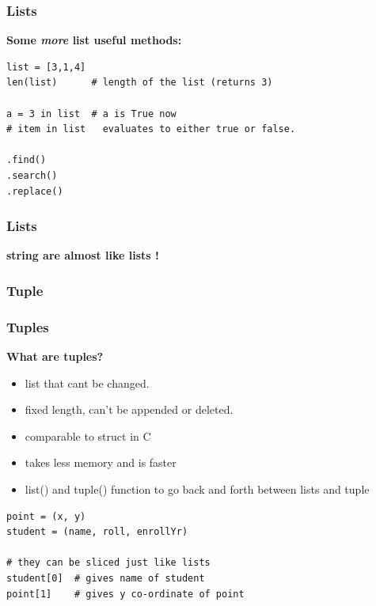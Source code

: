 \documentclass[12pt, aspectratio=169]{beamer}
\begin{document}
\begin{frame}[fragile]
  \frametitle{Lists}
\textbf{Some \textit{more} list useful methods: }
\vspace{1em}
\begin{verbatim}
list = [3,1,4] 
len(list)      # length of the list (returns 3)

a = 3 in list  # a is True now
# item in list   evaluates to either true or false.

.find()
.search()
.replace()

\end{verbatim}
\end{frame}

\begin{frame}[fragile]
  \frametitle{Lists}
\vspace{1em}
\textbf{string are almost like lists !}
\end{frame}

\subsubsection{Tuple}
\begin{frame}[fragile]
  \frametitle{Tuples}
\textbf{What are tuples?}
\begin{itemize}
\item list that cant be changed. 
\item fixed length, can't be appended or deleted.
\item comparable to struct in C
\item takes less memory and is faster 
\item list() and tuple() function to go back and forth between lists and tuple
\end{itemize}
\pause
\begin{verbatim}
point = (x, y)
student = (name, roll, enrollYr)

# they can be sliced just like lists
student[0]  # gives name of student
point[1]    # gives y co-ordinate of point

\end{verbatim}
\end{frame}
\end{document}
